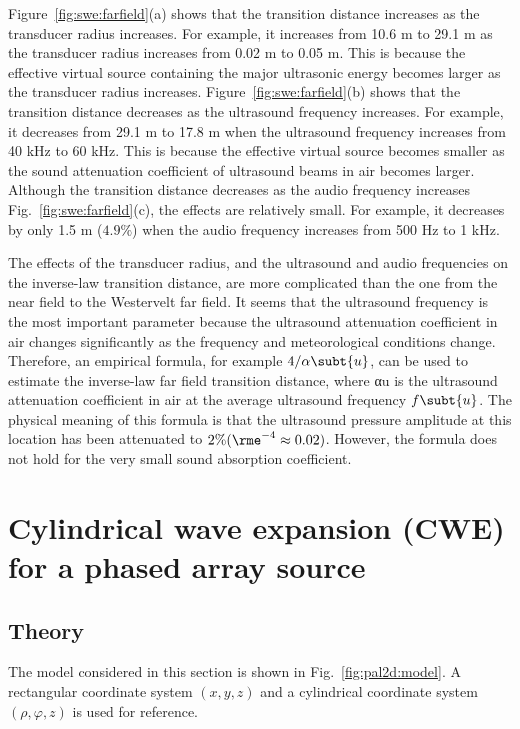 Figure~\ref{fig:swe:farfield}(a) shows that the transition distance increases as the transducer radius increases. 
For example, it increases from 10.6 m to 29.1 m as the transducer radius increases from 0.02 m to 0.05 m. 
This is because the effective virtual source containing the major ultrasonic energy becomes larger as the transducer radius increases. 
Figure~\ref{fig:swe:farfield}(b) shows that the transition distance decreases as the ultrasound frequency increases. 
For example, it decreases from 29.1 m to 17.8 m when the ultrasound frequency increases from 40 kHz to 60 kHz. 
This is because the effective virtual source becomes smaller as the sound attenuation coefficient of ultrasound beams in air becomes larger. 
Although the transition distance decreases as the audio frequency increases Fig.~\ref{fig:swe:farfield}(c), the effects are relatively small. 
For example, it decreases by only 1.5 m ($4.9\%$) when the audio frequency increases from 500 Hz to 1 kHz.

The effects of the transducer radius, and the ultrasound and audio frequencies on the inverse-law transition distance, are more complicated than the one from the near field to the Westervelt far field. 
It seems that the ultrasound frequency is the most important parameter because the ultrasound attenuation coefficient in air changes significantly as the frequency and meteorological conditions change. 
Therefore, an empirical formula, for example $4/\alpha\subt{u}$, 
can be used to estimate the inverse-law far field transition distance, where αu is the ultrasound attenuation coefficient in air at the average ultrasound frequency $f\subt{u}$. 
The physical meaning of this formula is that the ultrasound pressure amplitude at this location has been attenuated to $2\% (\rme^{-4} \approx 0.02)$. 
However, the formula does not hold for the very small sound absorption coefficient.

\section{Cylindrical wave expansion (CWE) for a phased array source}
\label{sec:cwe_source}

\subsection{Theory}
The model considered in this section is shown in Fig.~\ref{fig:pal2d:model}.
A rectangular coordinate system $(x,y,z)$ and a cylindrical coordinate system $(\rho,\varphi,z)$ is used for reference.

